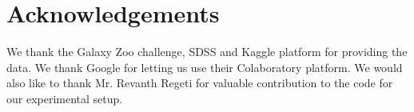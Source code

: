 \documentclass[fleqn,usenatbib]{mnras}
\begin{document}
\section{Acknowledgements}
\hspace*{0.25 in}We thank the Galaxy Zoo challenge, SDSS and Kaggle platform for providing the data. We thank Google for letting us use their Colaboratory platform. We would also like to thank Mr. Revanth Regeti for valuable contribution to the code for our experimental setup.











\bsp	%
\label{lastpage}
\end{document}
